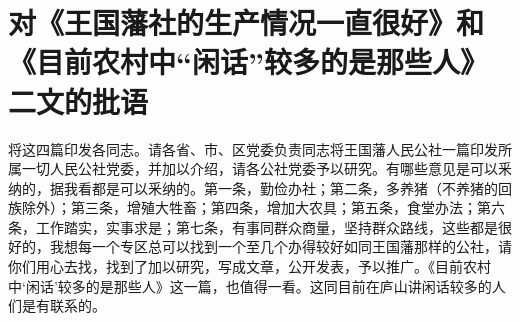 \section[对《王国藩社的生产情况一直很好》和《目前农村中“闲话”较多的是那些人》二文的批语（一九五九年八月六日）]{对《王国藩社的生产情况一直很好》和《目前农村中“闲话”较多的是那些人》二文的批语}


将这四篇印发各同志。请各省、市、区党委负责同志将王国藩人民公社一篇印发所属一切人民公社党委，并加以介绍，请各公社党委予以研究。有哪些意见是可以釆纳的，据我看都是可以釆纳的。第一条，勤俭办社；第二条，多养猪（不养猪的回族除外）；第三条，增殖大牲畜；第四条，增加大农具；第五条，食堂办法；第六条，工作踏实，实事求是；第七条，有事同群众商量，坚持群众路线，这些都是很好的，我想每一个专区总可以找到一个至几个办得较好如同王国藩那样的公社，请你们用心去找，找到了加以研究，写成文章，公开发表，予以推广。《目前农村中‘闲话’较多的是那些人》这一篇，也值得一看。这同目前在庐山讲闲话较多的人们是有联系的。


